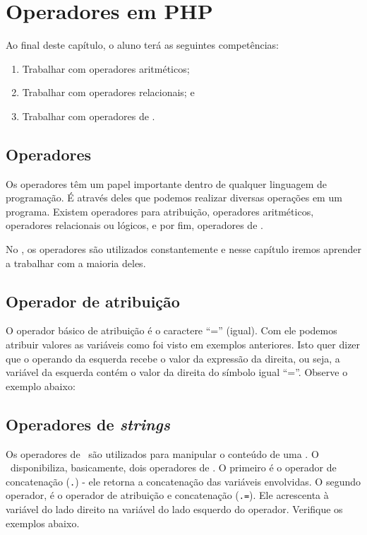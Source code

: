 \chapter{Operadores em PHP}

Ao final deste capítulo, o aluno terá as seguintes competências:
\begin{enumerate}
    \item Trabalhar com operadores aritméticos; 
    \item Trabalhar com operadores relacionais; e
    \item Trabalhar com operadores de \tipostring.
\end{enumerate}

\section{Operadores}
\label{operadores}

Os operadores têm um papel importante dentro de qualquer linguagem de programação.
É através deles que podemos realizar diversas operações em um programa. Existem
operadores para atribuição, operadores aritméticos, operadores relacionais ou lógicos,
e por fim, operadores de \tipostring.

No \php, os operadores são utilizados constantemente e nesse capítulo iremos
aprender a trabalhar com a maioria deles.

\section{Operador de atribuição}
\label{operador-atribuicao}

O operador básico de atribuição é o caractere ``='' (igual). Com ele podemos atribuir 
valores as variáveis como foi visto em exemplos anteriores. Isto quer dizer que o 
operando da esquerda recebe o valor da expressão da direita, ou seja, a variável da 
esquerda contém o valor da direita do símbolo igual ``=''. Observe o exemplo abaixo:



\section{Operadores de \textit{strings}}
\label{operadores-de-strings}
Os operadores de \tipostrings~são utilizados para manipular o conteúdo de uma \tipostring.
O \php~disponibiliza, basicamente, dois operadores de \tipostrings. O primeiro é o operador
de concatenação (\texttt{.}) - ele retorna a concatenação das variáveis envolvidas.
O segundo operador, é o operador de atribuição e concatenação (\texttt{.=}). Ele acrescenta
à variável do lado direito na variável do lado esquerdo do operador. Verifique os exemplos
abaixo.

